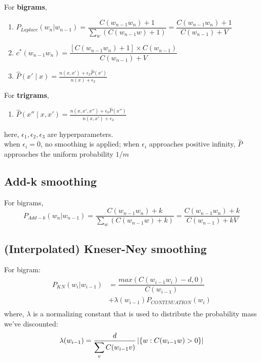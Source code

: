 \vspace{0.5cm}
\noindent
For \textbf{bigrams},

\begin{enumerate}[itemsep=0.15cm]
    \item $P_{Laplace}(w_n|w_{n-1}) = \dfrac{C(w_{n-1}w_n) + 1}{\sum_w (C(w_{n-1}w) + 1)} = \dfrac{C(w_{n-1}w_n) + 1}{C(w_{n-1}) + V} $

    \item $c^*(w_{n-1}w_n) = \dfrac{[C(w_{n-1}w_n)+1] \times C(w_{n-1})}{C(w_{n-1}) + V} $

    \item $\hat{P}(x' \mid x)  = \frac{n(x, x') + \epsilon_2 \hat{P}(x')}{n(x) + \epsilon_2}$ \hfill \cite{dnn-1}
\end{enumerate}

\vspace{0.5cm}
\noindent
For \textbf{trigrams},
\begin{enumerate}
    \item $\hat{P}(x'' \mid x,x') = \frac{n(x, x',x'') + \epsilon_3 \hat{P}(x'')}{n(x, x') + \epsilon_3}$ \hfill \cite{dnn-1}

\end{enumerate}

\vspace{0.5cm}
\noindent
here, $\epsilon_1,\epsilon_2, \epsilon_3$ are hyperparameters.\\
when $\epsilon_i = 0$, no smoothing is applied; when $\epsilon_i$ approaches positive infinity, $\hat{P}$ approaches the uniform probability $1/m$





\subsection{Add-k smoothing \cite{nlp-1}}

For bigrams,
\[
    P_{Add-k}(w_n|w_{n-1}) = \dfrac{C(w_{n-1}w_n) + k}{\sum_w (C(w_{n-1}w) + k)} = \dfrac{C(w_{n-1}w_n) + k}{C(w_{n-1}) + kV} 
\]

\subsection{(Interpolated) Kneser-Ney smoothing}

For bigram:
\[
\begin{aligned}
    P_{KN}(w_i|w_{i-1})  &= \dfrac{max(C(w_{i-1}w_i)-d,0)}{C(w_{i-1})} \\ 
    &+ \lambda (w_{i-1})P_{CONTINUATION}(w_i) \\ 
\end{aligned}
\]
where, $\lambda$ is a normalizing constant that is used to distribute the probability mass we’ve discounted:
\[
    \lambda(w_{i-1}) 
    = \dfrac{d}{\displaystyle\sum_v C(w_{i-1}v)} \left| \left\{w : C(w_{i-1}w) > 0\right\} \right|
\]

